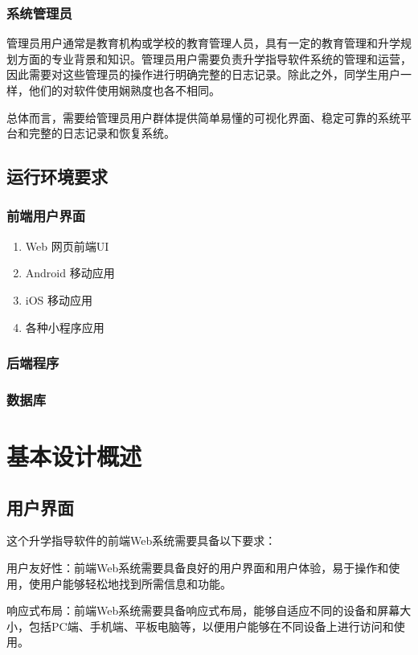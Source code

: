 \documentclass[UTF8]{ctexart}
\newcommand{\m}[1]{\textcolor{modify}{#1}}
\begin{document}
    \subsubsection{系统管理员}
    \par
    \m{管理员用户通常是教育机构或学校的教育管理人员，具有一定的教育管理和升学规划方面的专业背景和知识}。管理员用户需要负责升学指导软件系统的管理和运营，因此需要对这些管理员的操作进行明确完整的日志记录。除此之外，同学生用户一样，\m{他们的对软件使用娴熟度也各不相同}。

    \par
    总体而言，需要给管理员用户群体提供简单易懂的可视化界面、稳定可靠的系统平台和完整的日志记录和恢复系统。
    
    \subsection{运行环境要求}
    \subsubsection{前端用户界面}
    \begin{enumerate}
        \item Web 网页前端UI
        \item Android 移动应用
        \item iOS 移动应用
        \item 各种小程序应用
    \end{enumerate}
    \subsubsection{后端程序}
    \subsubsection{数据库}    

    \section{基本设计概述}
    \subsection{用户界面}
    这个升学指导软件的前端Web系统需要具备以下要求：

    用户友好性：前端Web系统需要具备良好的用户界面和用户体验，易于操作和使用，使用户能够轻松地找到所需信息和功能。

    响应式布局：前端Web系统需要具备响应式布局，能够自适应不同的设备和屏幕大小，包括PC端、手机端、平板电脑等，以便用户能够在不同设备上进行访问和使用。
\end{document}
